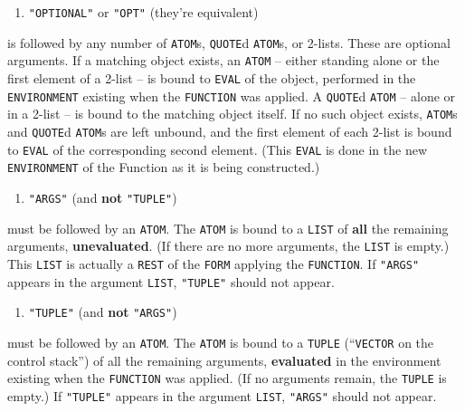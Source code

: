 \documentclass[a4paper,]{article}
\providecommand{\tightlist}{%
  \setlength{\itemsep}{0pt}\setlength{\parskip}{0pt}}
\begin{document}
\begin{enumerate}
\def\labelenumi{(\arabic{enumi})}
\setcounter{enumi}{2}
\tightlist
\item
  \texttt{"OPTIONAL"} or \texttt{"OPT"}   (they're equivalent)
\end{enumerate}

is followed by any number of \texttt{ATOM}s, \texttt{QUOTE}d \texttt{ATOM}s, or 2-lists. These are optional arguments. If a
matching object exists, an \texttt{ATOM} -- either standing alone or the first element of a 2-list -- is bound to
\texttt{EVAL} of the object, performed in the \texttt{ENVIRONMENT} existing when the \texttt{FUNCTION} was applied. A
\texttt{QUOTE}d \texttt{ATOM} -- alone or in a 2-list -- is bound to the matching object itself. If no such object exists,
\texttt{ATOM}s and \texttt{QUOTE}d \texttt{ATOM}s are left unbound, and the first element of each 2-list is bound to
\texttt{EVAL} of the corresponding second element. (This \texttt{EVAL} is done in the new \texttt{ENVIRONMENT} of the
Function as it is being constructed.)

\begin{enumerate}
\def\labelenumi{(\arabic{enumi})}
\setcounter{enumi}{3}
\tightlist
\item
  \texttt{"ARGS"} (and \textbf{not} \texttt{"TUPLE"})
\end{enumerate}

must be followed by an \texttt{ATOM}. The \texttt{ATOM} is bound to a \texttt{LIST} of \textbf{all} the remaining
arguments, \textbf{unevaluated}. (If there are no more arguments, the \texttt{LIST} is empty.) This \texttt{LIST} is
actually a \texttt{REST} of the \texttt{FORM} applying the \texttt{FUNCTION}. If \texttt{"ARGS"} 
appears in the argument \texttt{LIST}, \texttt{"TUPLE"} should not appear.

\begin{enumerate}
\def\labelenumi{(\arabic{enumi})}
\setcounter{enumi}{3}
\tightlist
\item
  \texttt{"TUPLE"}  (and \textbf{not} \texttt{"ARGS"})
\end{enumerate}

must be followed by an \texttt{ATOM}. The \texttt{ATOM} is bound to a \texttt{TUPLE} (``\texttt{VECTOR} on the control
stack'') of all the remaining arguments, \textbf{evaluated} in the environment existing when the \texttt{FUNCTION} was
applied. (If no arguments remain, the \texttt{TUPLE} is empty.) If \texttt{"TUPLE"} appears in the argument \texttt{LIST},
\texttt{"ARGS"} should not appear.
\end{document}
